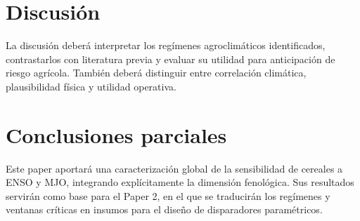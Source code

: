 
\section{Discusión}

La discusión deberá interpretar los regímenes agroclimáticos identificados, contrastarlos con literatura previa y evaluar su utilidad para anticipación de riesgo agrícola. También deberá distinguir entre correlación climática, plausibilidad física y utilidad operativa.


\section{Conclusiones parciales}

Este paper aportará una caracterización global de la sensibilidad de cereales a ENSO y MJO, integrando explícitamente la dimensión fenológica. Sus resultados servirán como base para el Paper 2, en el que se traducirán los regímenes y ventanas críticas en insumos para el diseño de disparadores paramétricos.

